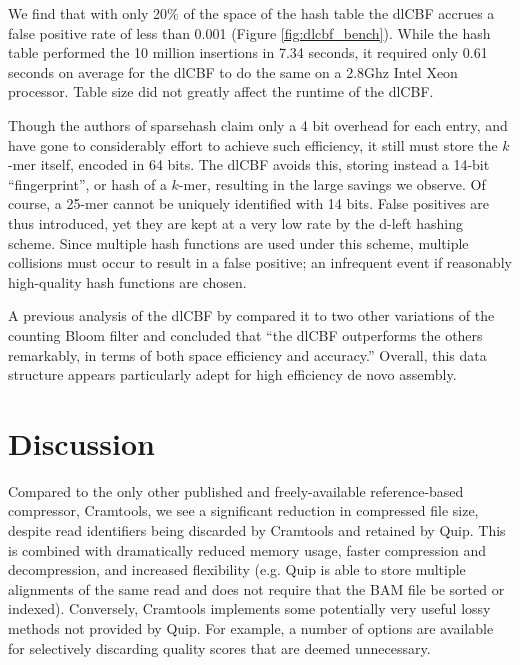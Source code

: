 \documentclass[twocolumn]{article}
\begin{document}
We find that with only 20\% of the space of the hash table the dlCBF accrues a
false positive rate of less than 0.001 (Figure \ref{fig:dlcbf_bench}). While
the hash table performed the 10 million insertions in 7.34 seconds, it
required only 0.61 seconds on average for the dlCBF to do the same on a 2.8Ghz
Intel Xeon processor. Table size did not greatly affect the runtime of the
dlCBF.

Though the authors of sparsehash claim only a 4 bit overhead for each entry,
and have gone to considerably effort to achieve such efficiency, it still must
store the $k$-mer itself, encoded in 64 bits. The dlCBF avoids this, storing
instead a 14-bit ``fingerprint'', or hash of a $k$-mer, resulting in the large
savings we observe. Of course, a 25-mer cannot be uniquely identified with 14
bits. False positives are thus introduced, yet they are kept at a very low
rate by the d-left hashing scheme. Since multiple hash functions are used
under this scheme, multiple collisions must occur to result in a false
positive; an infrequent event if reasonably high-quality hash functions are
chosen.

A previous analysis of the dlCBF by \citet{Zhang2009} compared it to two other
variations of the counting Bloom filter and concluded that ``the dlCBF
outperforms the others remarkably, in terms of both space efficiency and
accuracy.'' Overall, this data structure appears particularly adept for high
efficiency de novo assembly.

\section{Discussion}

Compared to the only other published and freely-available reference-based
compressor, Cramtools, we see a significant reduction in compressed file size,
despite read identifiers being discarded by Cramtools and retained by Quip.
This is combined with dramatically reduced memory usage, faster compression
and decompression, and increased flexibility (e.g. Quip is able to store
multiple alignments of the same read and does not require that the BAM file be
sorted or indexed). Conversely, Cramtools implements some potentially very
useful lossy methods not provided by Quip. For example, a number of options
are available for selectively discarding quality scores that are deemed
unnecessary.

\end{document}
